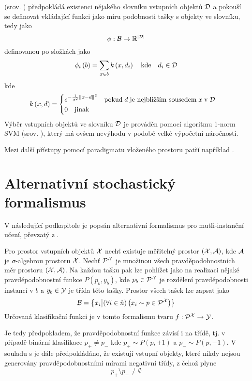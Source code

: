  (srov. \cite{chen_miles:_2006}) předpokládá existenci nějakého slovníku vstupních objektů \( \mathcal D \) a pokouší se definovat vkládající funkci jako míru podobnosti tašky s objekty ve slovníku, tedy jako
\[ \phi : \mathcal B \to \mathbb R^{\left| \mathcal D \right|} \]
definovanou po složkách jako
\[ \phi_i \left( b \right) = \sum_{x \in b} k \left( x, d_i \right) \quad \text{kde} \quad d_i \in \mathcal D \]
kde
\[ k \left( x, d \right) = \begin{cases}
	e^{- \frac{1}{\sigma^2} \left\Vert x - d \right\Vert^2} \quad \text{pokud} \; d \; \text{je nejbližším sousedem} \; x \; \text{v} \; \mathcal D \\
	0 \quad \text{jinak}
\end{cases} \]
Výběr vstupních objektů ve slovníku \( \mathcal D \) je prováděn pomocí algoritmu 1-norm SVM (srov. \cite{zhu_1-norm_2004}), který má ovšem nevýhodu v podobě velké výpočetní náročnosti.

Mezi další přístupy pomocí paradigmatu vloženého prostoru patří například \cite{cheplygina_multiple_2015}.

\section{Alternativní stochastický formalismus}
V následující podkapitole je popsán alternativní formalismus pro mutli-instanční učení, převzatý z \cite{muandet_learning_2012}.

Pro prostor vstupních objektů \( \mathcal X \) nechť existuje měřitelný prostor \( \left( \mathcal X, \mathcal A \right) \), kde \( \mathcal A \) je \( \sigma \)-algebrou prostoru \( \mathcal X \). Nechť \( \mathcal P^{\mathcal X} \) je množinou všech pravděpodobnostních měr prostoru \( \left( \mathcal X, \mathcal A \right) \). Na každou tašku pak lze pohlížet jako na realizaci nějaké pravděpodobnostní funkce \( P \left( p_b, y_b \right) \), kde \( p_b \in \mathcal P^{\mathcal X} \) je rozdělení pravděpodobnosti instancí v \( b \) a \( y_b \in \mathcal Y \) je třída této tašky. Prostor všech tašek lze zapsat jako
\[ \mathcal B = \left\{ x_i \middle| \left( \forall i \in \hat n \right) \left( x_i \sim p \in \mathcal P^{\mathcal X} \right) \right\} \]
Určovaná klasifikační funkci je v tomto formalismu tvaru \( f : \mathcal P^{\mathcal X} \to \mathcal Y \).

Je tedy předpokladem, že pravděpodobnostní funkce závisí i na třídě, tj. v případě binární klasifikace \( p_+ \neq p_- \) kde \( p_+ \sim P(p, +1) \) a \( p_- \sim P(p, -1) \). V souladu s \cite{dietterich_solving_1997} je dále předpokládáno, že existují vstupní objekty, které nikdy nejsou generovány pravděpodobnostními mírami negativní třídy, z čehož plyne
\[ p_+ \setminus p_- \neq \emptyset \]

